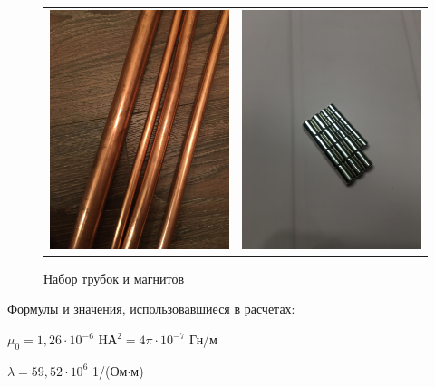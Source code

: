 \documentclass[a4paper,12pt]{article} %
\begin{document}
\begin{figure}[ht]\center
\begin{tabular}{cc}
\includegraphics[width=80mm]{трубы.JPG}
&
\includegraphics[width=80mm]{магниты.JPG}
\end{tabular}
\caption{Набор трубок и магнитов}
\end{figure}

Формулы и значения, использовавшиеся в расчетах:

$\mu_0 = 1,26\cdot10^{-6}$ H\cdot $А^2 = 4\pi \cdot 10^{-7}$ Гн/м

$\lambda = 59,52 \cdot 10^6$ 1/(Ом$\cdot$м)
\end{document}

